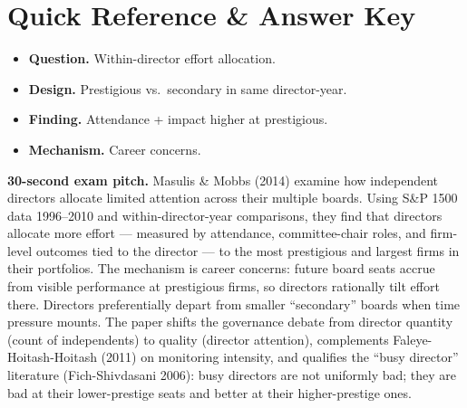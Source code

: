 \documentclass[11pt]{article}
\begin{document}
\section*{Quick Reference \& Answer Key}
\begin{answerbox}
\begin{itemize}
\item \textbf{Question.} Within-director effort allocation.
\item \textbf{Design.} Prestigious vs.\ secondary in same director-year.
\item \textbf{Finding.} Attendance + impact higher at prestigious.
\item \textbf{Mechanism.} Career concerns.
\end{itemize}
\end{answerbox}

\begin{keybox}
\textbf{30-second exam pitch.} Masulis \& Mobbs (2014) examine how independent directors allocate limited attention across their multiple boards. Using S\&P 1500 data 1996--2010 and within-director-year comparisons, they find that directors allocate more effort --- measured by attendance, committee-chair roles, and firm-level outcomes tied to the director --- to the most prestigious and largest firms in their portfolios. The mechanism is career concerns: future board seats accrue from visible performance at prestigious firms, so directors rationally tilt effort there. Directors preferentially depart from smaller ``secondary'' boards when time pressure mounts. The paper shifts the governance debate from director quantity (count of independents) to quality (director attention), complements Faleye-Hoitash-Hoitash (2011) on monitoring intensity, and qualifies the ``busy director'' literature (Fich-Shivdasani 2006): busy directors are not uniformly bad; they are bad at their lower-prestige seats and better at their higher-prestige ones.
\end{keybox}
\end{document}
